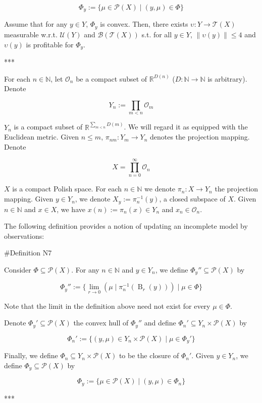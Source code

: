 \documentclass[a4paper]{article}
\newcommand{\Nats}{\mathbb{N}}
\newcommand{\Reals}{\mathbb{R}}
\newcommand{\Norm}[1]{\lVert #1 \rVert}
\newcommand{\Prob}{\mathcal{P}}
\newcommand{\Ob}{\mathcal{O}}
\newcommand{\T}{\mathcal{T}}
\newcommand{\B}{\mathcal{B}}
\newcommand{\UM}{\mathcal{U}}
\newcommand{\Ball}{\operatorname{B}}
\begin{document}
$${\Phi_y := \{\mu \in \Prob(X) \mid (y,\mu) \in \Phi\}}$$ 

Assume that for any ${y \in Y}$, ${\Phi_y}$ is convex. Then, there exists ${\upsilon: Y \rightarrow \T(X)}$ measurable w.r.t. ${\UM(Y)}$ and ${\B(\T(X))}$ s.t. for all ${y \in Y}$, ${\Norm{\upsilon(y)} \leq 4}$ and ${\upsilon(y)}$ is profitable for ${\Phi_y}$.

***

For each ${n \in \Nats}$, let ${\Ob_n}$ be a compact subset of $\Reals^{D(n)}$ ($D: \Nats \rightarrow \Nats$ is arbitrary). Denote 

$${Y_n:=\prod_{m < n} \Ob_m}$$

${Y_n}$ is a compact subset of ${\Reals^{\sum_{m < n} D(m)}}$. We will regard it as equipped with the Euclidean metric. Given ${n \leq m}$, ${\pi_{nm}: Y_m \rightarrow Y_n}$ denotes the projection mapping. Denote 

$${X = \prod_{n = 0}^\infty \Ob_n}$$

${X}$ is a compact Polish space. For each ${n \in \Nats}$ we denote ${\pi_{n}: X \rightarrow Y_n}$ the projection mapping. Given ${y \in Y_n}$, we denote ${X_y:=\pi_{n}^{-1}(y)}$, a closed subspace of ${X}$. Given $n \in \Nats$ and $x \in X$, we have $x(n):=\pi_{n}(x) \in Y_n$ and $x_n \in \Ob_n$.

The following definition provides a notion of updating an incomplete model by observations:

\#Definition N7

Consider ${\Phi \subseteq \Prob(X)}$. For any ${n \in \Nats}$ and ${y \in Y_n}$, we define ${\Phi_y'' \subseteq \Prob(X)}$ by

$$\Phi_y'':=\{\lim_{r \rightarrow 0} (\mu \mid \pi_{n}^{-1}(\Ball_r(y))) \mid \mu \in \Phi\}$$

Note that the limit in the definition above need not exist for every ${\mu \in \Phi}$.

Denote ${\Phi_y' \subseteq \Prob(X)}$ the convex hull of ${\Phi_y''}$ and define ${\Phi_n' \subseteq Y_n \times \Prob(X)}$ by

$$\Phi_n':=\{(y,\mu) \in Y_n \times \Prob(X) \mid \mu \in \Phi_y'\}$$

Finally, we define ${\Phi_n \subseteq Y_n \times \Prob(X)}$ to be the closure of ${\Phi_n'}$. Given ${y \in Y_n}$, we define ${\Phi_y \subseteq \Prob(X)}$ by

$$\Phi_y:=\{\mu \in \Prob(X) \mid (y,\mu) \in \Phi_n\}$$

***
\end{document}
